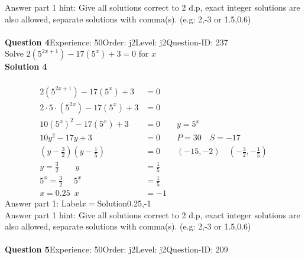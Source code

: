 \documentclass{article}
\begin{document}
Answer part 1 hint: \hspace{15pt} Give all solutions correct to 2 d.p, exact integer solutions are also allowed, separate solutions with comma(s). (e.g: 2,-3 or 1.5,0.6)\\
\\[4pt]
\noindent\textbf{Question 4}\hspace{20pt}Experience: 50\hspace{20pt}Order: j2\hspace{20pt}Level: j2\hspace{20pt}Question-ID: 237\\[2pt]
Solve $2(5^{2x+1})-17(5^x)+3=0$ for $x$\\[4pt]
\noindent\textbf{Solution 4}\\[2pt]
\\[-35pt]\begin{align*}
2(5^{2x+1})-17(5^x)+3&=0\\[2pt]
2\!\cdot\!5\!\cdot\!(5^{2x})-17(5^x)+3&=0\\[2pt]
10(5^{x})^2-17(5^x)+3&=0\qquad y=5^x\\[2pt]
10y^2-17y+3&=0\qquad P=30 \quad S=-17\\[2pt]
\left(y-\displaystyle\frac{3}{2}\right)\left(y-\displaystyle\frac{1}{5}\right)&=0\qquad (-15,-2)\quad \left(-\displaystyle\frac{3}{2},-\displaystyle\frac{1}{5}\right)\\[2pt]
y=\displaystyle\frac{3}{2} \qquad y&=\displaystyle\frac{1}{5}\\[2pt]
5^x=\displaystyle\frac{3}{2}\hspace{16pt} 5^x&=\displaystyle\frac{1}{5}\\[2pt]
x=0.25 \hspace{6pt} x&=-1
\end{align*}
Answer part 1: \hspace{10pt}Label\hspace{10pt}$x=$\hspace{10pt}Solution\hspace{10pt}0.25,-1\\
Answer part 1 hint: \hspace{15pt}Give all solutions correct to 2 d.p, exact integer solutions are also allowed, separate solutions with comma(s).  (e.g:  2,-3 or 1.5,0.6)  \\
\\[4pt]
\noindent\textbf{Question 5}\hspace{20pt}Experience: 50\hspace{20pt}Order: j2\hspace{20pt}Level: j2\hspace{20pt}Question-ID: 209\\[2pt]
\end{document}
